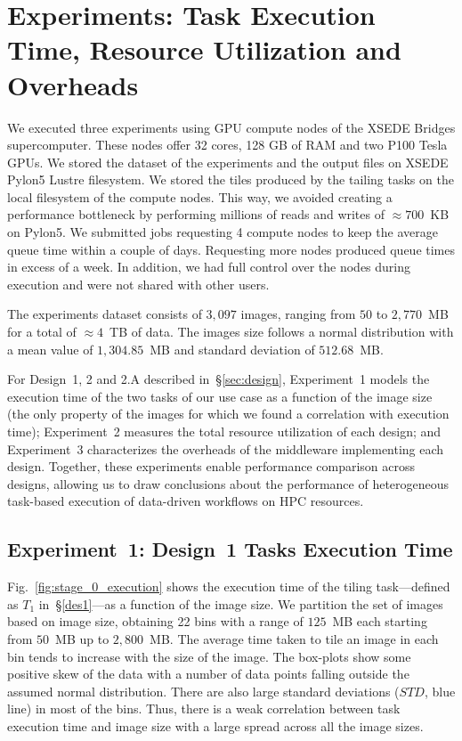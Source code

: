 \section{Experiments: Task Execution Time, Resource Utilization and Overheads}\label{sec:des_experiments}
We executed three experiments using GPU compute nodes of the XSEDE Bridges supercomputer.
These nodes offer 32 cores, 128 GB of RAM and two P100 Tesla GPUs.
We stored the dataset of the experiments and the output files on XSEDE Pylon5 Lustre filesystem.
We stored the tiles produced by the tailing tasks on the local filesystem of the compute nodes.
This way, we avoided creating a performance bottleneck by performing millions of reads and writes of $\approx700$~KB on Pylon5.
We submitted jobs requesting 4 compute nodes to keep the average queue time within a couple of days.
Requesting more nodes produced queue times in excess of a week.
In addition, we had full control over the nodes during execution and were not shared with other users.

The experiments dataset consists of $3,097$ images, ranging from $50$ to $2,770$~MB for a total of $\approx4$~TB of data.
The images size follows a normal distribution with a mean value of $1,304.85$~MB and standard deviation of $512.68$~MB.


For Design~1, 2 and 2.A described in~\S\ref{sec:design}, Experiment~1 models the execution time of the two tasks of our use case as a function of the image size (the only property of the images for which we found a correlation with execution time); Experiment~2 measures the total resource utilization of each design; and Experiment~3 characterizes the overheads of the middleware implementing each design.
Together, these experiments enable performance comparison across designs, allowing us to draw conclusions about the performance of heterogeneous task-based execution of data-driven workflows on HPC resources.

\subsection{Experiment~1: Design~1 Tasks Execution Time}
\label{ssec:des1analysis}


Fig.~\ref{fig:stage_0_execution} shows the execution time of the tiling task---defined as $T_{1}$ in~\S\ref{des1}---as a function of the image size.
We partition the set of images based on image size, obtaining 22 bins with a range of $125$~MB each starting from $50$~MB up to $2,800$~MB.
The average time taken to tile an image in each bin tends to increase with the size of the image.
The box-plots show some positive skew of the data with a number of data points  falling outside the assumed normal distribution.
There are also large standard  deviations ($STD$, blue line) in most of the bins.
Thus, there is a weak correlation between task execution time and image size with a large spread  across all the image sizes.

